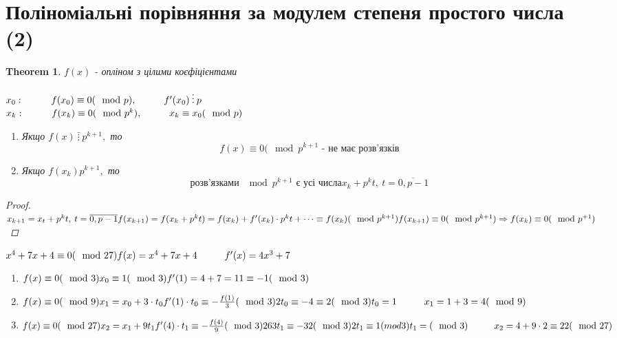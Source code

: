 \documentclass[a4paper,12pt, centered]{bookest}
\newtheorem{theorem}{Theorem}[section]
\newcommand\tab[1][1cm]{\hspace*{#1}}
\begin{document}
\section{Поліноміальні порівняння за модулем степеня простого числа (2)}
\begin{theorem}
	$f(x)$ - опліном з цілими коєфіцієнтами 
	\begin{center}
		$x_0:\tab f(x_0)\equiv0(\mod p),\tab f'(x_0)\>\vdots\>p$\\$x_k:\tab f(x_k)\equiv0(\mod p^k),\tab x_k\equiv x_0(\mod p)$\\
		\begin{enumerate}
			\item Якщо $f(x)\>\bar{\vdots}\>p^{k+1},$ то $$f(x)\equiv0(\mod p^{k+1}\textrm{ - не має розв'язків}$$
			\item Якщо $f(x_k)p^{k+1},$ то 
			$$\textrm{розв'язками } \mod p^{k+1}\textrm{ є усі числа}x_k+p^kt,\>t=\overline{0,p-1}$$
		\end{enumerate}
	\end{center}
	\begin{proof}
		$\\x_{k+1}=x_t+p^kt,\>t=\overline{0,p-1}\\f(x_{k+1})=f(x_k+p^kt)=f(x_k)+f'(x_k)\cdot p^kt+\dots\equiv f(x_k)(\mod p^{k+1})\\f(x_{k+1})\equiv 0(\mod p^{k+1})\Rightarrow f(x_k)\equiv0(\mod p^{+1})$
	\end{proof}
\end{theorem}
\begin{example}
	$x^4+7x+4\equiv0(\mod 27)\\f(x)=x^4+7x+4\tab f'(x)=4x^3+7$\begin{enumerate}
		\item $f(x)\equiv0(\mod 3)\\x_0\equiv 1(\mod 3)\\f'(1)=4+7=11\equiv-1(\mod 3)$
		\item $f(x)\equiv0(\mod 9)\\x_1=x_0+3\cdot t_0\\f'(1)\cdot t_0\equiv-\frac{f(1)}{3}(\mod 3)\\2t_0\equiv-4\equiv 2(\mod 3)\\t_0=1\tab x_1=1+3=4(\mod 9)$
		\item $f(x)\equiv0(\mod 27)\\x_2=x_1+9t_1\\f'(4)\cdot t_1\equiv -\frac{f(4)}{9}(\mod 3)\\263t_1\equiv-32(\mod 3)\\2t_1\equiv 1(mod 3)\\t_1=(\mod 3)\tab x_2=4+9\cdot2\equiv 22(\mod 27)$
	\end{enumerate}
\end{example}
\end{document}
